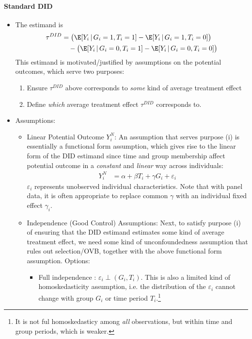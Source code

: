 \documentclass[12pt]{article}
\theoremstyle{plain}
\theoremstyle{definition}
\theoremstyle{remark}
\begin{document}
\paragraph{Standard DID}
\begin{itemize}
  \item
    The estimand is
    \begin{align*}
      \tau^{DID}
      &=
      \big(
      \E[Y_i\,|\,G_i=1,T_i=1]
      -
      \E[Y_i\,|\,G_i=1,T_i=0]
      \big)
      \\
      &\quad
      -
      \big(
      \E[Y_i\,|\,G_i=0,T_i=1]
      -
      \E[Y_i\,|\,G_i=0,T_i=0]
      \big)
    \end{align*}
    This estimand is motivated/justified by assumptions on the potential
    outcomes, which serve two purposes:
    \begin{enumerate}[label=(\roman*)]
      \item Ensure $\tau^{DID}$ above corresponds to \emph{some} kind of
        average treatment effect
      \item Define \emph{which} average treatment effect $\tau^{DID}$
        corresponds to.
    \end{enumerate}

  \item
    Assumptions:
    \begin{itemize}
      \item Linear Potential Outcome $Y_i^N$:
        An assumption that serves purpose (i) is essentially a
        functional form assumption, which gives rise to the linear form
        of the DID estimand since time and group membership affect
        potential outcome in a \emph{constant} and \emph{linear} way
        across individuals:
        \begin{align*}
          Y_i^N &= \alpha + \beta T_i + \gamma G_i + \varepsilon_i
        \end{align*}
        $\varepsilon_i$ represents unobserved individual
        characteristics.
        Note that with panel data, it is often appropriate to replace
        common $\gamma$ with an individual fixed effect $\gamma_i$.

      \item
        Independence (Good Control) Assumptions:
        Next, to satisfy purpose (i) of ensuring that the DID estimand
        estimates some kind of average treatment effect, we need some
        kind of unconfoundedness assumption that rules out
        selection/OVB, together with the above functional form
        assumption.
        Options:
        \begin{itemize}
          \item Full independence \citep{blundellmacurdy2000}:
            $\varepsilon_i \perp (G_i,T_i)$.
            This is also a limited kind of homoskedasticity assumption, i.e.
            the distribution of the $\varepsilon_i$ cannot change with group
            $G_i$ or time period $T_i$.\footnote{%
              It is not ful homoskedasticy among \emph{all}
              observations, but within time and group periods, which
              is weaker.
            }


\end{itemize}
\end{itemize}
\end{itemize}
\end{document}
